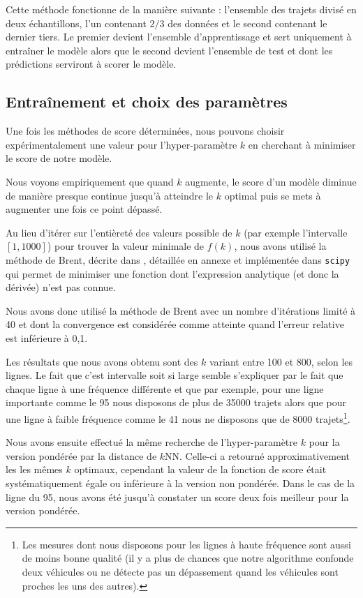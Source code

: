 \documentclass[letterpaper]{article}
\begin{document}
Cette méthode fonctionne de la manière suivante : l'ensemble des trajets divisé en deux échantillons, l'un contenant $2/3$ des données et le second contenant le dernier tiers. Le premier devient l'ensemble d'apprentissage et sert uniquement à entraîner le modèle alors que le second devient l'ensemble de test et dont les prédictions serviront à scorer le modèle.

\subsection{Entraînement et choix des paramètres}

Une fois les méthodes de score déterminées, nous pouvons choisir expérimentalement une valeur pour l'hyper-paramètre $k$ en cherchant à minimiser le score de notre modèle.

Nous voyons empiriquement que quand $k$ augmente, le score d'un modèle diminue de manière presque continue jusqu'à atteindre le $k$ optimal puis se mets à augmenter une fois ce point dépassé.

Au lieu d'itérer sur l'entièreté des valeurs possible de $k$ (par exemple l’intervalle $[1,1000]$) pour trouver la valeur minimale de $f(k)$, nous avons utilisé la méthode de Brent, décrite dans \cite{rivlin1973algorithms}, détaillée en annexe et implémentée dans \texttt{scipy} qui permet de minimiser une fonction dont l'expression analytique (et donc la dérivée) n'est pas connue.

Nous avons donc utilisé la méthode de Brent avec un nombre d'itérations limité à 40 et dont la convergence est considérée comme atteinte quand l'erreur relative est inférieure à 0,1.

Les résultats que nous avons obtenu sont des $k$ variant entre 100 et 800, selon les lignes. Le fait que c'est intervalle soit si large semble s'expliquer par le fait que chaque ligne à une fréquence différente et que par exemple, pour une ligne importante comme le 95 nous disposons de plus de 35000 trajets alors que pour une ligne à faible fréquence comme le 41 nous ne disposons que de 8000 trajets\footnote{Les mesures dont nous disposons pour les lignes à haute fréquence sont aussi de moins bonne qualité (il y a plus de chances que notre algorithme confonde deux véhicules ou ne détecte pas un dépassement quand les véhicules sont proches les uns des autres).}.

Nous avons ensuite effectué la même recherche de l'hyper-paramètre $k$ pour la version pondérée par la distance de $k$NN. Celle-ci a retourné approximativement les les mêmes $k$ optimaux, cependant la valeur de la fonction de score était systématiquement égale ou inférieure à la version non pondérée. Dans le cas de la ligne du 95, nous avons été jusqu'à constater un score deux fois meilleur pour la version pondérée.
\end{document}
